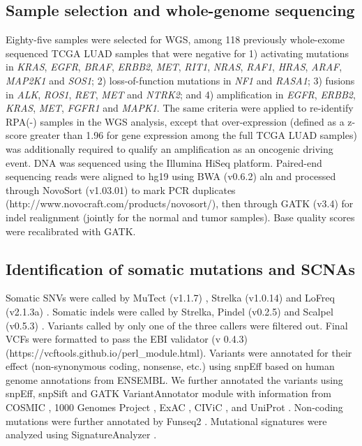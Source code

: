 \documentclass[phd,tocprelim]{cornell}
\begin{document}
\subsection*{Sample selection and whole-genome sequencing}
Eighty-five samples were selected for WGS, among 118 previously whole-exome sequenced TCGA LUAD samples that were negative for 1) activating mutations in \textit{KRAS}, \textit{EGFR}, \textit{BRAF}, \textit{ERBB2}, \textit{MET}, \textit{RIT1}, \textit{NRAS}, \textit{RAF1}, \textit{HRAS}, \textit{ARAF}, \textit{MAP2K1} and \textit{SOS1}; 2) loss-of-function mutations in \textit{NF1} and \textit{RASA1}; 3) fusions in \textit{ALK}, \textit{ROS1}, \textit{RET}, \textit{MET} and \textit{NTRK2}; and 4) amplification in \textit{EGFR}, \textit{ERBB2}, \textit{KRAS}, \textit{MET}, \textit{FGFR1} and \textit{MAPK1}. The same criteria were applied to re-identify RPA(-) samples in the WGS analysis, except that over-expression (defined as a z-score greater than 1.96 for gene expression among the full TCGA LUAD samples) was additionally required to qualify an amplification as an oncogenic driving event.
DNA was sequenced using the Illumina HiSeq platform. Paired-end sequencing reads were aligned to hg19 using BWA (v0.6.2) \cite{Li2009-uz} aln and processed through NovoSort (v1.03.01) to mark PCR duplicates (http://www.novocraft.com/products/novosort/), then through GATK (v3.4) \cite{McKenna2010-tm} for indel realignment (jointly for the normal and tumor samples). Base quality scores were recalibrated with GATK.

\subsection*{Identification of somatic mutations and SCNAs}
Somatic SNVs were called by MuTect (v1.1.7) \cite{Cibulskis2013-ui}, Strelka (v1.0.14) \cite{Saunders2012-rm} and LoFreq (v2.1.3a) \cite{Wilm2012-rd}. Somatic indels were called by Strelka, Pindel (v0.2.5) \cite{Ye2009-tr} and Scalpel (v0.5.3) \cite{Narzisi2014-gy}. Variants called by only one of the three callers were filtered out. Final VCFs were formatted to pass the EBI validator (v 0.4.3) (https://vcftools.github.io/perl\_module.html). Variants were annotated for their effect (non-synonymous coding, nonsense, etc.) using snpEff \cite{Cingolani2012-bn} based on human genome annotations from ENSEMBL. We further annotated the variants using snpEff, snpSift \cite{Cingolani2012-bn} and GATK VariantAnnotator module with information from COSMIC \cite{Sondka2018-ad}, 1000 Genomes Project \cite{Consortium2015-dz} , ExAC \cite{Karczewski2017-ek}, CIViC \cite{Griffith2017-io}, and UniProt \cite{Consortium2019-bm}. Non-coding mutations were further annotated by Funseq2 \cite{Fu2014-so}. Mutational signatures were analyzed using SignatureAnalyzer \cite{Kim2016-vk}.
\end{document}
